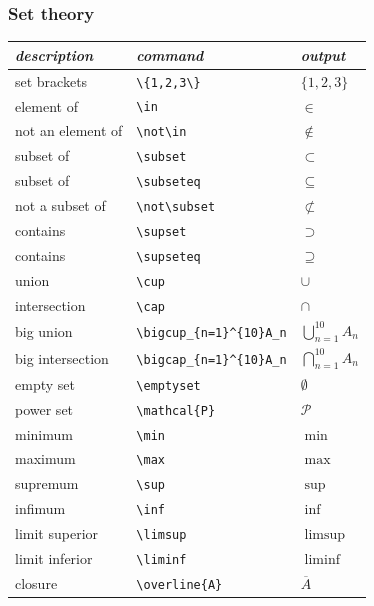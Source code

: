 \documentclass{article} %
\begin{document}
    \subsubsection{Set theory}
        \begin{center}
        \begin{tabular}{l|l|l}
        \emph{description} & \emph{command} & \emph{output}\\ \hline
        set brackets & \verb!\{1,2,3\}! & $\{1,2,3\}$\\
        element of & \verb!\in! & $\in$\\
        not an element of & \verb!\not\in! & $\not\in$\\
        subset of & \verb!\subset! & $\subset$\\
        subset of & \verb!\subseteq! & $\subseteq$\\
        not a subset of & \verb!\not\subset! & $\not\subset$\\
        contains & \verb!\supset! & $\supset$\\
        contains & \verb!\supseteq! & $\supseteq$\\
        union & \verb!\cup! & $\cup$\\
        intersection & \verb!\cap! & $\cap$\\
        big union & 
        \verb!\bigcup_{n=1}^{10}A_n! &
        $\displaystyle \bigcup_{n=1}^{10}A_{n}$\\
        big intersection & \verb!\bigcap_{n=1}^{10}A_n! &$\displaystyle \bigcap_{n=1}^{10}A_{n}$\\
        empty set & \verb!\emptyset! & $\emptyset$\\
        power set & \verb!\mathcal{P}! & $\mathcal{P}$\\
        minimum & \verb!\min! & $\min$\\
        maximum & \verb!\max! & $\max$\\
        supremum & \verb!\sup! & $\sup$\\
        infimum & \verb!\inf! & $\inf$\\
        limit superior & \verb!\limsup! & $\limsup$\\
        limit inferior & \verb!\liminf! & $\liminf$\\
        closure & \verb!\overline{A}! & $\overline{A}$
        \end{tabular}
        \end{center}
\end{document}
